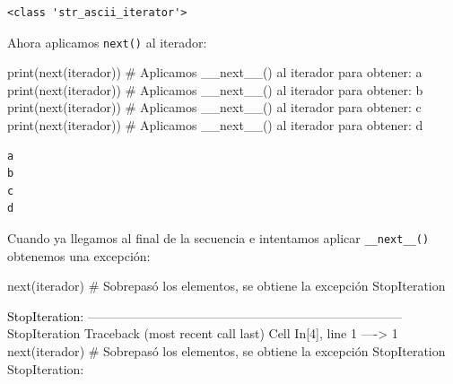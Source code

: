 \documentclass[
  spanish,
  letterpaper,
]{scrbook}
\newenvironment{Shaded}{\begin{snugshade}}{\end{snugshade}}
\newcommand{\BuiltInTok}[1]{\textcolor[rgb]{0.00,0.23,0.31}{#1}}
\newcommand{\CommentTok}[1]{\textcolor[rgb]{0.37,0.37,0.37}{#1}}
\newcommand{\NormalTok}[1]{\textcolor[rgb]{0.00,0.23,0.31}{#1}}
\theoremstyle{definition}
\theoremstyle{remark}
\begin{document}
\begin{verbatim}
<class 'str_ascii_iterator'>
\end{verbatim}

Ahora aplicamos \texttt{next()} al iterador:

\begin{Shaded}
\begin{Highlighting}[]
\BuiltInTok{print}\NormalTok{(}\BuiltInTok{next}\NormalTok{(iterador)) }\CommentTok{\# Aplicamos \_\_next\_\_()  al iterador para obtener: a}
\BuiltInTok{print}\NormalTok{(}\BuiltInTok{next}\NormalTok{(iterador)) }\CommentTok{\# Aplicamos \_\_next\_\_()  al iterador para obtener: b}
\BuiltInTok{print}\NormalTok{(}\BuiltInTok{next}\NormalTok{(iterador)) }\CommentTok{\# Aplicamos \_\_next\_\_()  al iterador para obtener: c}
\BuiltInTok{print}\NormalTok{(}\BuiltInTok{next}\NormalTok{(iterador)) }\CommentTok{\# Aplicamos \_\_next\_\_()  al iterador para obtener: d}
\end{Highlighting}
\end{Shaded}

\begin{verbatim}
a
b
c
d
\end{verbatim}

Cuando ya llegamos al final de la secuencia e intentamos aplicar
\texttt{\_\_next\_\_()} obtenemos una excepción:

\begin{Shaded}
\begin{Highlighting}[]
\BuiltInTok{next}\NormalTok{(iterador) }\CommentTok{\# Sobrepasó los elementos, se obtiene la excepción StopIteration}
\end{Highlighting}
\end{Shaded}

\begin{Highlighting}
\textcolor{black}{StopIteration: }
\textcolor{black}{}\textcolor{QuartoInternalColor1}{---------------------------------------------------------------------------}\textcolor{QuartoInternalColor2}{}
\textcolor{QuartoInternalColor2}{}\textcolor{QuartoInternalColor1}{StopIteration}\textcolor{QuartoInternalColor2}{                             Traceback (most recent call last)}
\textcolor{QuartoInternalColor2}{}\textcolor{QuartoInternalColor3}{Cell}\textcolor{QuartoInternalColor2}{}\textcolor{QuartoInternalColor3}{ }\textcolor{QuartoInternalColor2}{}\textcolor{QuartoInternalColor4}{In[4]}\textcolor{QuartoInternalColor2}{}\textcolor{QuartoInternalColor4}{, line 1}\textcolor{QuartoInternalColor2}{}
\textcolor{QuartoInternalColor2}{}\textcolor{QuartoInternalColor4}{----> }\textcolor{QuartoInternalColor2}{}\textcolor{QuartoInternalColor4}{1}\textcolor{QuartoInternalColor2}{ }\textcolor{QuartoInternalColor5}{next}\textcolor{QuartoInternalColor2}{}\textcolor{QuartoInternalColor2}{(}\textcolor{QuartoInternalColor2}{}\textcolor{QuartoInternalColor2}{iterador}\textcolor{QuartoInternalColor2}{}\textcolor{QuartoInternalColor2}{)}\textcolor{QuartoInternalColor2}{ }\textcolor{QuartoInternalColor9}{# Sobrepasó los elementos, se obtiene la excepción StopIteration}\textcolor{QuartoInternalColor2}{}
\textcolor{QuartoInternalColor2}{}\textcolor{QuartoInternalColor1}{StopIteration}\textcolor{QuartoInternalColor2}{: }
\end{Highlighting}
\end{document}
